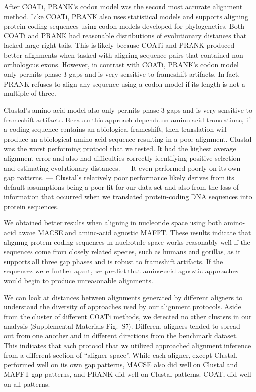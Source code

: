 \documentclass[12pt,letterpaper]{article}
\begin{document}
After COATi, PRANK's codon model was the second most accurate alignment method. Like COATi, PRANK also uses statistical models and supports aligning protein-coding sequences using codon models developed for phylogenetics. Both COATi and PRANK had reasonable distributions of evolutionary distances that lacked large right tails. This is likely because COATi and PRANK produced better alignments when tasked with aligning sequence pairs that contained non-orthologous exons. However, in contrast with COATi, PRANK's codon model only permits phase-3 gaps and is very sensitive to frameshift artifacts. In fact, PRANK refuses to align any sequence using a codon model if its length is not a multiple of three.

Clustal\textOmega{}'s amino-acid model also only permits phase-3 gaps and is very sensitive to frameshift artifacts. Because this approach depends on amino-acid translations, if a coding sequence contains an abiological frameshift, then translation will produce an abiological amino-acid sequence resulting in a poor alignment. Clustal\textOmega{} was the worst performing protocol that we tested. It had the highest average alignment error and also had difficulties correctly identifying positive selection and estimating evolutionary distances.  --- It even performed poorly on its own gap patterns. --- Clustal\textOmega{}'s relatively poor performance likely derives from its default assumptions being a poor fit for our data set and also from the loss of information that occurred when we translated protein-coding DNA sequences into protein sequences.

We obtained better results when aligning in nucleotide space using both amino-acid aware MACSE and amino-acid agnostic MAFFT. These results indicate that aligning protein-coding sequences in nucleotide space works reasonably well if the sequences come from closely related species, such as humans and gorillas, as it supports all three gap phases and is robust to frameshift artifacts. If the sequences were further apart, we predict that amino-acid agnostic approaches would begin to produce unreasonable alignments. 

We can look at distances between alignments generated by different aligners to understand the diversity of approaches used by our alignment protocols. Aside from the cluster of different COATi methods, we detected no other clusters in our analysis (Supplemental Materials Fig.~S7). Different aligners tended to spread out from one another and in different directions from the benchmark dataset. This indicates that each protocol that we utilized approached alignment inference from a different section of ``aligner space''. While each aligner, except Clustal\textOmega{}, performed well on its own gap patterns, MACSE also did well on Clustal\textOmega{} and MAFFT gap patterns, and PRANK did well on Clustal\textOmega{} patterns. COATi did well on all patterns.
\end{document}
